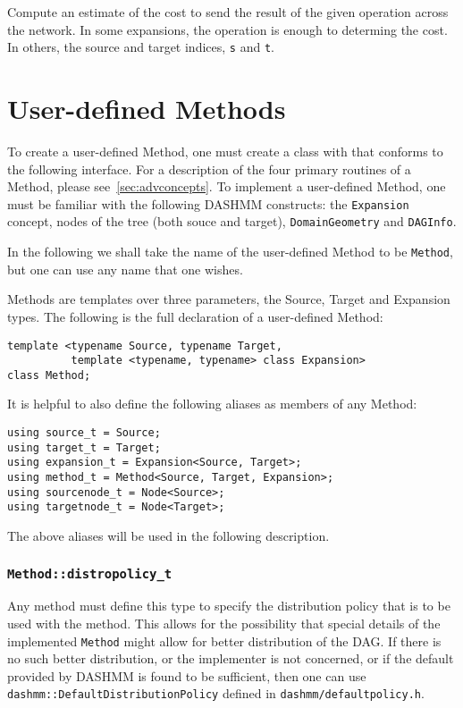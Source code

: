 Compute an estimate of the cost to send the result of the given operation
across the network. In some expansions, the operation is enough to determing
the cost. In others, the source and target indices, \texttt{s} and \texttt{t}.



\section{User-defined Methods}

To create a user-defined Method, one must create a class with that conforms
to the following interface. For a description of the four primary routines
of a Method, please see~\ref{sec:advconcepts}. To implement a user-defined
Method, one must be familiar with the following DASHMM constructs: the
\texttt{Expansion} concept, nodes of the tree (both souce and target),
\texttt{DomainGeometry} and \texttt{DAGInfo}.

In the following we shall take the name of the user-defined Method to be
\texttt{Method}, but one can use any name that one wishes.

Methods are templates over three parameters, the Source, Target and Expansion
types. The following is the full declaration of a user-defined Method:

\begin{verbatim}
template <typename Source, typename Target,
          template <typename, typename> class Expansion>
class Method;
\end{verbatim}

\noindent It is helpful to also define the following aliases as members of
any Method:

\begin{verbatim}
using source_t = Source;
using target_t = Target;
using expansion_t = Expansion<Source, Target>;
using method_t = Method<Source, Target, Expansion>;
using sourcenode_t = Node<Source>;
using targetnode_t = Node<Target>;
\end{verbatim}

\noindent The above aliases will be used in the following description.

\subsubsection{\texttt{Method::distropolicy\_t}}

Any method must define this type to specify the distribution policy that is to
be used with the method. This allows for the possibility that special details
of the implemented \texttt{Method} might allow for better distribution of the
DAG. If there is no such better distribution, or the implementer is not
concerned, or if the default provided by DASHMM is found to be sufficient, then
one can use \texttt{dashmm::DefaultDistributionPolicy} defined in
\texttt{dashmm/defaultpolicy.h}.

